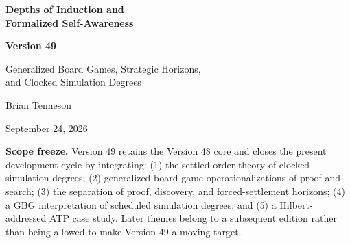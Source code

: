 \documentclass[11pt]{article}
\theoremstyle{remark}
\begin{document}
\hypersetup{pageanchor=false}

\begin{titlepage}
\thispagestyle{empty}
\centering
\vspace*{0.65in}
{\Huge\bfseries Depths of Induction and\\[0.12em]Formalized Self-Awareness\par}
\vspace{0.32in}
{\LARGE\bfseries Version 49\par}
\vspace{0.28in}
{\Large Generalized Board Games, Strategic Horizons,\\
and Clocked Simulation Degrees\par}
\vspace{0.8in}
{\Large Brian Tenneson\par}
\vspace{0.16in}
{\large September 24, 2026\par}
\vfill
\begin{minipage}{0.82\textwidth}
\small
\textbf{Scope freeze.}
Version 49 retains the Version 48 core and closes the present development cycle by integrating:
(1) the settled order theory of clocked simulation degrees;
(2) generalized-board-game operationalizations of proof and search;
(3) the separation of proof, discovery, and forced-settlement horizons;
(4) a GBG interpretation of scheduled simulation degrees; and
(5) a Hilbert-addressed ATP case study.
Later themes belong to a subsequent edition rather than being allowed to make Version 49 a moving target.
\end{minipage}
\vfill
\end{titlepage}
\end{document}
